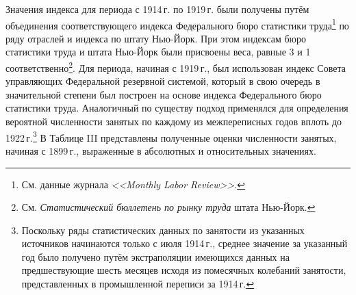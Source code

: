 \documentclass[leqno]{article}  %
\begin{document}
\par
Значения индекса для периода с 1914\,г. по 1919\,г. были получены путём объединения соответствующего индекса Федерального бюро статистики труда\footnote{См. данные журнала \emph{<<Monthly Labor Review>>}.} по ряду отраслей и индекса по штату Нью-Йорк. При этом индексам бюро статистики труда и штата Нью-Йорк были присвоены веса, равные 3 и 1 соответственно\footnote{См. \emph{Статистический бюллетень по рынку труда} штата Нью-Йорк.}. Для периода, начиная с 1919\,г., был использован индекс Совета управляющих Федеральной резервной системой, который в свою очередь в значительной степени был построен на основе индекса Федерального бюро статистики труда. Аналогичный по существу подход применялся для определения вероятной численности занятых по каждому
из межпереписных годов вплоть до 1922\,г.\footnote{Поскольку ряды статистических данных по занятости из указанных источников начинаются только с июля 1914\,г., среднее значение за указанный год было получено путём экстраполяции имеющихся данных на предшествующие шесть месяцев исходя из помесячных колебаний занятости, представленных в промышленной переписи за 1914\,г.} В Таблице III представлены полученные оценки численности занятых, начиная с 1899\,г., выраженные в абсолютных и относительных значениях.
\end{document}
